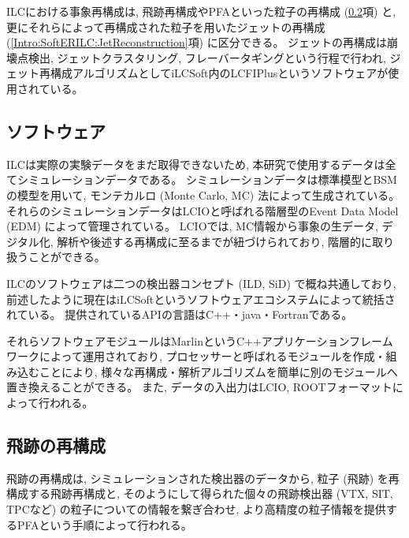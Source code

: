 ILCにおける事象再構成は, 飛跡再構成やPFAといった粒子の再構成 (\ref{Intro:SoftERILC:ParticleReconstruction}項) と, 更にそれらによって再構成された粒子を用いたジェットの再構成 (\ref{Intro:SoftERILC:JetReconstruction}項) に区分できる。
ジェットの再構成は崩壊点検出, ジェットクラスタリング, フレーバータギングという行程で行われ, ジェット再構成アルゴリズムとしてiLCSoft内のLCFIPlus\cite{LCFIPlus, LCFIPlusPaper}というソフトウェアが使用されている。


\subsection{ソフトウェア} \label{Intro:SoftERILC:Software}

ILCは実際の実験データをまだ取得できないため, 本研究で使用するデータは全てシミュレーションデータである。
シミュレーションデータは標準模型とBSMの模型を用いて, モンテカルロ (Monte Carlo, MC) 法によって生成されている。
それらのシミュレーションデータはLCIOと呼ばれる階層型のEvent Data Model (EDM) によって管理されている。
LCIOでは, MC情報から事象の生データ, デジタル化, 解析や後述する再構成に至るまでが紐づけられており, 階層的に取り扱うことができる。

ILCのソフトウェアは二つの検出器コンセプト (ILD, SiD) で概ね共通しており, 前述したように現在はiLCSoftというソフトウェアエコシステムによって統括されている。
提供されているAPIの言語はC++・java・Fortranである。

それらソフトウェアモジュールはMarlin\cite{Marlinpaper}というC++アプリケーションフレームワークによって運用されており, プロセッサーと呼ばれるモジュールを作成・組み込むことにより, 様々な再構成・解析アルゴリズムを簡単に別のモジュールへ置き換えることができる。
また, データの入出力はLCIO, ROOTフォーマットによって行われる。

\newpage
\subsection{飛跡の再構成} \label{Intro:SoftERILC:ParticleReconstruction}

飛跡の再構成は, シミュレーションされた検出器のデータから, 粒子 (飛跡) を再構成する飛跡再構成と, そのようにして得られた個々の飛跡検出器 (VTX, SIT, TPCなど) の粒子についての情報を繋ぎ合わせ, より高精度の粒子情報を提供するPFAという手順によって行われる。\\

